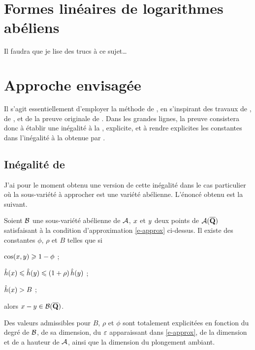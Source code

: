 \documentclass{mpg-preth}
\begin{document}
\printbibliography[heading=bibempty]

\else

\section{Formes linéaires de logarithmes abéliens}

Il faudra que je lise des trucs à ce sujet\dots

\section{Approche envisagée}\label{s-approche}

Il s'agit essentiellement d'employer la méthode de , en s'inspirant
des travaux de  \cite{remivds,remivg,remdcl}, de 
\cite{farhith}, et de la preuve originale de  \cite{faldaav}. Dans
les grandes lignes, la preuve consistera donc à établir une inégalité à la
, explicite, et à rendre explicites les constantes dans
l'inégalité à la  obtenue par .

\subsection{Inégalité de }

J'ai pour le moment obtenu une version de cette inégalité dans le cas
particulier où la sous-variété à approcher est une variété abélienne.
L'énoncé obtenu est la suivant.

\begin{thm} \label{thm-mumford}
  Soient $\mathcal B$ une sous-variété abélienne de $\mathcal A$, $x$ et $y$
  deux points de $\mathcal A(\overline{{\mathbf{Q}}})$ satisfaisant à la condition d'approximation
  \eqref{e-approx} ci-dessus. Il existe des constantes $\phi$, $\rho$ et $B$
  telles que si
  \begin{enumthm}
    \item $\cos(x, y) \geqslant 1 - \phi$ ;
    \item $\mathop{\smash{\hat h}}(x) \leqslant \mathop{\smash{\hat h}}(y) \leqslant (1+\rho) \mathop{\smash{\hat h}}(y)$ ;
    \item $\mathop{\smash{\hat h}}(x) > B$ ;
  \end{enumthm}
  alors $x - y \in \mathcal B(\overline{{\mathbf{Q}}})$.
\end{thm}

Des valeurs admissibles pour $B$, $\rho$ et $\phi$ sont totalement explicitées
en fonction du degré de $\mathcal B$, de sa dimension, du $\varepsilon$ apparaissant dans
\eqref{e-approx}, de la dimension et de a hauteur de $\mathcal A$, ainsi que la dimension
du plongement ambiant.
\end{document}
